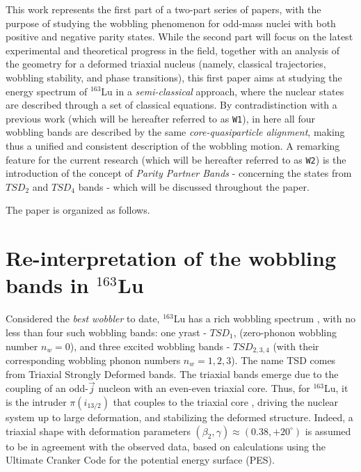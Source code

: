 \documentclass[myclassdoc,debug]{rjparticle}
\begin{document}
This work represents the first part of a two-part series of papers, with the purpose of studying the wobbling phenomenon for odd-mass nuclei with both positive and negative parity states. While the second part will focus on the latest experimental and theoretical progress in the field, together with an analysis of the geometry for a deformed triaxial nucleus (namely, classical trajectories, wobbling stability, and phase transitions), this first paper aims at studying the energy spectrum of $^{163}$Lu in a \emph{semi-classical} approach, where the nuclear states are described through a set of classical equations. By contradistinction with a previous work \cite{raduta2020towards} (which will be hereafter referred to as \texttt{W1}), in here all four wobbling bands are described by the same \emph{core-quasiparticle alignment}, making thus a unified and consistent description of the wobbling motion. A remarking feature for the current research (which will be hereafter referred to as \texttt{W2}) is the introduction of the concept of \emph{Parity Partner Bands} - concerning the states from $TSD_2$ and $TSD_4$ bands -  which will be discussed throughout the paper.


The paper is organized as follows.

\section{\texorpdfstring{Re-interpretation of the wobbling bands in $^{163}$Lu}%
                               {Re-interpretation of the wobbling bands structure for 163Lu}}
\label{section-reinterpretation}
Considered the \emph{best wobbler} to date, $^{163}$Lu has a rich wobbling spectrum \cite{odegaard2001evidence,jensen2002evidence}, with no less than four such wobbling bands: one yrast - $TSD_1$, (zero-phonon wobbling number $n_w=0$), and three excited wobbling bands - $TSD_{2,3,4}$ (with their corresponding wobbling phonon numbers $n_w=1,2,3$). The name TSD comes from Triaxial Strongly Deformed bands. The triaxial bands emerge due to the coupling of an odd-$\vec{j}$ nucleon with an even-even triaxial core. Thus, for $^{163}$Lu, it is the intruder $\pi(i_{13/2})$ that couples to the triaxial core \cite{odegaard2001evidence,hamamoto2002wobbling,jensen2002wobbling}, driving the nuclear system up to large deformation, and stabilizing the deformed structure. Indeed, a triaxial shape with deformation parameters \cite{bohr1998nuclear} $(\beta_2,\gamma)\approx(0.38,+20^\circ)$ is assumed to be in agreement with the observed data, based on calculations using the Ultimate Cranker Code \cite{bengtsson1990high} for the potential energy surface (PES).
\end{document}
